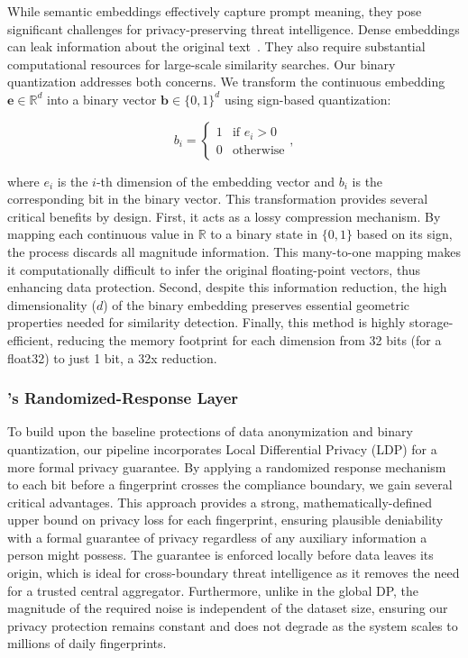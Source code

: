 While semantic embeddings effectively capture prompt meaning, they pose significant challenges for privacy-preserving threat intelligence.
Dense embeddings can leak information about the original text~\cite{forbesSystemsVector, li2023sentence, tragoudaras2025information, owasp2025vectorEmbedding}.
They also require substantial computational resources for large-scale similarity searches.
Our binary quantization addresses both concerns.
We transform the continuous embedding $\mathbf{e} \in \mathbb{R}^d$ into a binary vector $\mathbf{b} \in \{0,1\}^d$ using sign-based quantization:

$$
    b_i = \begin{cases}
        1 & \text{if } e_i > 0 \\
        0 & \text{otherwise}
    \end{cases},
$$

where $e_i$ is the $i$-th dimension of the embedding vector and $b_i$ is the corresponding bit in the binary vector.
This transformation provides several critical benefits by design. 
First, it acts as a lossy compression mechanism. 
By mapping each continuous value in $\mathbb{R}$ to a binary state in $\{0,1\}$  based on its sign, the process discards all magnitude information. 
This many-to-one mapping makes it computationally difficult to infer the original floating-point vectors, thus enhancing data protection. 
Second, despite this information reduction, the high dimensionality ($d$) of the binary embedding preserves essential geometric properties needed for similarity detection. 
Finally, this method is highly storage-efficient, reducing the memory footprint for each dimension from 32 bits (for a float32) to just 1 bit, a 32x reduction.







\subsubsection{\tool's Randomized-Response Layer}
To build upon the baseline protections of data anonymization and binary quantization, our pipeline incorporates Local Differential Privacy (LDP) for a more formal privacy guarantee. 
By applying a randomized response mechanism~\cite{warner1965randomized,rappor,Wang2017Locally} to each bit before a fingerprint crosses the compliance boundary, we gain several critical advantages. 
This approach provides a strong, mathematically-defined upper bound on privacy loss for each fingerprint, ensuring plausible deniability with a formal guarantee of privacy regardless of any auxiliary information a person might possess. 
The guarantee is enforced locally before data leaves its origin, which is ideal for cross-boundary threat intelligence as it removes the need for a trusted central aggregator. Furthermore, unlike in the global DP, the magnitude of the required noise is independent of the dataset size, ensuring our privacy protection remains constant and does not degrade as the system scales to millions of daily fingerprints.


